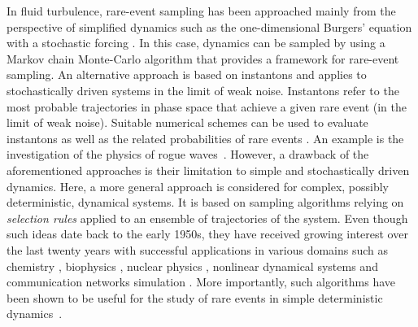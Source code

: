 %
In fluid turbulence, rare-event sampling has been approached mainly from the perspective of simplified dynamics such as the one-dimensional Burgers' equation with a stochastic forcing \citep{bec_burgers_2007}. In this case, dynamics can be sampled by using a Markov chain Monte-Carlo algorithm \citep{duben_monte_2008,mesterhazy2011anomalous,mesterhazy2013lattice} that provides a framework for rare-event sampling.
%
An alternative approach is based on instantons \citep{gurarie_instantons_1996,grafke2015instanton} and applies to stochastically driven systems in the limit of weak noise.
Instantons refer to the most probable trajectories in phase space that achieve a given rare event (in the limit of weak noise). Suitable numerical schemes can be used to evaluate instantons as well as the related probabilities of rare events \citep{chernykh_large_2001,grafke_instanton_2013,grigorio_instantons_2017,laurie2015computation,bouchet2014langevin}.
An example is the investigation of the physics of rogue waves~\citep{dematteis2018rogue,dematteis2019experimental}.
%
However, a drawback of the aforementioned approaches is their limitation to simple and stochastically driven dynamics.
%
%
%
Here, a more general approach is considered for complex, possibly deterministic, dynamical systems.
It is based on sampling algorithms relying on \emph{selection rules} applied to an ensemble of trajectories of the system. 
%
Even though such ideas date back to the early 1950s, they have received growing interest over the last twenty years with successful applications in various domains such as chemistry \citep{van_erp_elaborating_2005,escobedo_transition_2009,teo_adaptive_2016}, biophysics \citep{huber_weighted-ensemble_1996,zuckerman2017weighted,bolhuis2005kinetic}, nuclear physics \citep{louvin2017}, nonlinear dynamical systems \citep{tailleur_probing_2007} and communication networks simulation \citep{villen-altamirano_restart:_1994}.
More importantly, such algorithms have been shown to be useful for the study of rare events in simple deterministic dynamics~\citep{wouters2016rare}.
%
%
%
